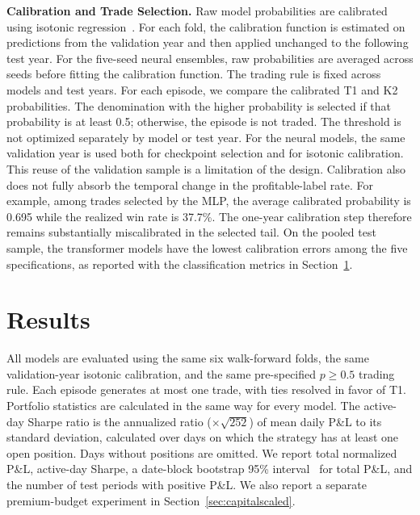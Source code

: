 \documentclass[sigconf,review,anonymous]{acmart}
\begin{document}
\smallskip\noindent\textbf{Calibration and Trade Selection.}
\label{sec:calibration}
Raw model probabilities are calibrated using isotonic regression~\cite{zadrozny2002transforming}. For each fold, the calibration function is estimated on predictions from the validation year and then applied unchanged to the following test year. For the five-seed neural ensembles, raw probabilities are averaged across seeds before fitting the calibration function.
The trading rule is fixed across models and test years. For each episode, we compare the calibrated T1 and K2 probabilities. The denomination with the higher probability is selected if that probability is at least 0.5; otherwise, the episode is not traded. The threshold is not optimized separately by model or test year.
For the neural models, the same validation year is used both for checkpoint selection and for isotonic calibration. This reuse of the validation sample is a limitation of the design. Calibration also does not fully absorb the temporal change in the profitable-label rate. For example, among trades selected by the MLP, the average calibrated probability is 0.695 while the realized win rate is 37.7\%. The one-year calibration step therefore remains substantially miscalibrated in the selected tail. On the pooled test sample, the transformer models have the lowest calibration errors among the five specifications, as reported with the classification metrics in Section~\ref{sec:results}.

\section{Results}
\label{sec:results}

All models are evaluated using the same six walk-forward folds, the same validation-year isotonic calibration, and the same pre-specified $p\ge0.5$ trading rule. Each episode generates at most one trade, with ties resolved in favor of T1. Portfolio statistics are calculated in the same way for every model.
The active-day Sharpe ratio is the annualized ratio ($\times\sqrt{252}$) of mean daily P\&L to its standard deviation, calculated over days on which the strategy has at least one open position. Days without positions are omitted. We report total normalized P\&L, active-day Sharpe, a date-block bootstrap 95\% interval~\cite{kunsch1989} for total P\&L, and the number of test periods with positive P\&L. We also report a separate premium-budget experiment in Section~\ref{sec:capitalscaled}.
\end{document}
